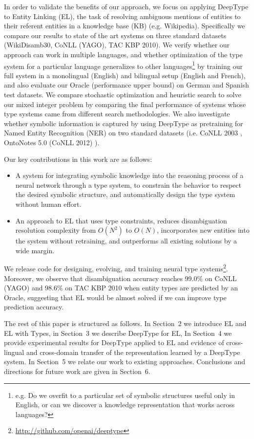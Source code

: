 \documentclass[letterpaper]{article}
\begin{document}
In order to validate the benefits of our approach, we focus on applying DeepType to Entity Linking (EL), the task of resolving ambiguous mentions of entities to their referent entities in a knowledge base (KB) (e.g. Wikipedia).
Specifically we compare our results to state of the art systems on three standard datasets (WikiDisamb30, CoNLL (YAGO), TAC KBP 2010). 
We verify whether our approach can work in multiple languages, and whether optimization of the type system for a particular language generalizes to other languages\footnote{e.g. Do we overfit to a particular set of symbolic structures useful only in English, or can we discover a knowledge representation that works across languages?} by training our full system in a monolingual (English) and bilingual setup (English and French), and also evaluate our Oracle (performance upper bound) on German and Spanish test datasets. We compare stochastic optimization and heuristic search to solve our mixed integer problem by comparing the final performance of systems whose type systems came from different search methodologies. We also investigate whether symbolic information is captured by using DeepType as pretraining for Named Entity Recognition (NER) on two standard datasets (i.e. CoNLL 2003 \cite{Sang2003IntroductionTT}, OntoNotes 5.0 (CoNLL 2012) \cite{Pradhan2012CoNLL2012ST}).

Our key contributions in this work are as follows:
\begin{itemize}
\item  A system for integrating symbolic knowledge into the reasoning process of a neural network through a type system, to constrain the behavior to respect the desired symbolic structure, and automatically design the type system without human effort.
\item An approach to EL that uses type constraints, reduces disambiguation resolution complexity from $O(N^2)$ to $O(N)$, incorporates new entities into the system without retraining, and outperforms all existing solutions by a wide margin.
\end{itemize}
We release code for designing, evolving, and training neural type systems\footnote{\url{http://github.com/openai/deeptype}}. Moreover, we observe that disambiguation accuracy reaches 99.0\% on CoNLL (YAGO) and 98.6\% on TAC KBP 2010 when entity types are predicted by an Oracle, suggesting that EL would be almost solved if we can improve type prediction accuracy.

The rest of this paper is structured as follows. In Section~2 we introduce EL and EL with Types, in Section~3 we describe DeepType for EL, In Section~4 we provide experimental results for DeepType applied to EL and evidence of cross-lingual and cross-domain transfer of the representation learned by a DeepType system. In Section~5 we relate our work to existing approaches. Conclusions and directions for future work are given in Section~6.
\end{document}
